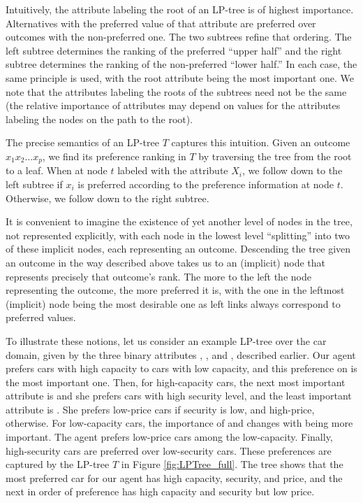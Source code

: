 Intuitively, the attribute labeling the root of an LP-tree is of highest 
importance. Alternatives with the preferred value of that attribute
are preferred over outcomes with the non-preferred one. The two
subtrees refine that ordering. The left subtree determines the ranking
of the preferred ``upper half'' and the right subtree determines the 
ranking of the non-preferred ``lower half.'' In each case, the same 
principle is used, with the root attribute being the most important one. 
We note that the attributes labeling the roots of the 
subtrees need not be the same (the relative importance of attributes may 
depend on values for the attributes labeling the nodes on the path to the root).

The precise semantics of an LP-tree $T$ captures this intuition. Given 
an outcome $x_1x_2\ldots x_p$, we find its preference ranking in 
$T$ by traversing the tree from the root to a leaf. When at node $t$ 
labeled with the attribute $X_i$, we follow down to the left subtree if
$x_i$ is preferred according to the preference information at node
$t$. Otherwise, we follow down to the right subtree. 

It is convenient to imagine the existence of yet another level of nodes 
in the tree, not represented explicitly, with each node in the lowest 
level ``splitting'' into two of these
implicit nodes, each representing an outcome. Descending the tree 
given an outcome in the way described above takes us to an (implicit) 
node that represents precisely that outcome's rank.
The more to the left the node representing the outcome, the more 
preferred it is, with the one in the leftmost (implicit) node being the 
most desirable one as left links always correspond to preferred values.

To illustrate these notions, let us consider an example LP-tree
over the car domain, given by the three binary attributes 
, , and ,
described earlier.
Our agent prefers cars with high capacity to cars with low capacity,
and this preference on  is the most important one.
Then, for high-capacity cars, the next most important attribute is
 and she prefers cars with high security level,
and the least important attribute is .
She prefers low-price cars if security is low, and high-price, otherwise.
For low-capacity cars, the importance of 
and  changes with  being more important.
The agent prefers low-price cars among the low-capacity.
Finally, high-security cars are preferred over low-security cars.
These preferences are captured by 
the LP-tree $T$ in Figure \ref{fig:LPTree_full}. The tree shows that
the most preferred car for our agent has high capacity, security,
and price, and the next in order of preference has high capacity
and security but low price.

